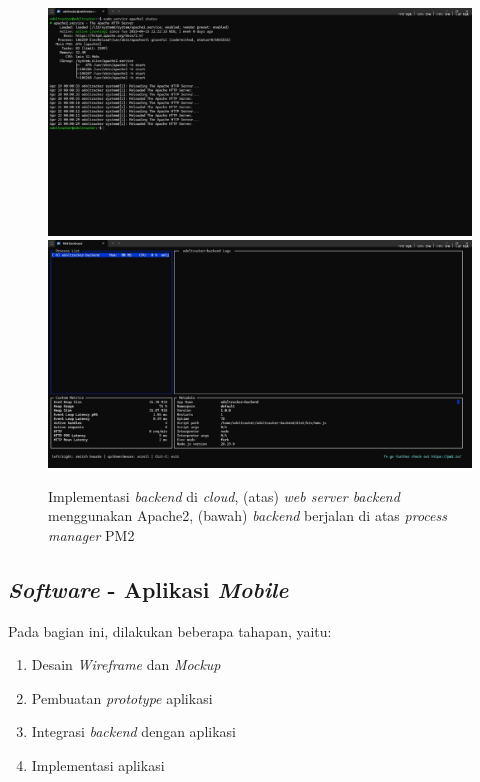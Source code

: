 \begin{figure}[htbp]
  \centering

  \includegraphics[scale=0.45]{gambar/bab3-implementasi-backend.jpeg}
  \includegraphics[scale=0.45]{gambar/bab3-implementasi-backend-2.jpeg}

  \caption{\centering Implementasi \emph{backend} di \emph{cloud}, (atas) \emph{web server backend} menggunakan Apache2, (bawah) \emph{backend} berjalan di atas \emph{process manager} PM2}
  \label{fig:implementationbackend}
\end{figure}

\subsection{\emph{Software} - Aplikasi \emph{Mobile}}

Pada bagian ini, dilakukan beberapa tahapan, yaitu:
\begin{enumerate}[nolistsep]
  \item Desain \textit{Wireframe} dan \textit{Mockup}
  \item Pembuatan \emph{prototype} aplikasi
  \item Integrasi \emph{backend} dengan aplikasi
  \item Implementasi aplikasi
\end{enumerate}

